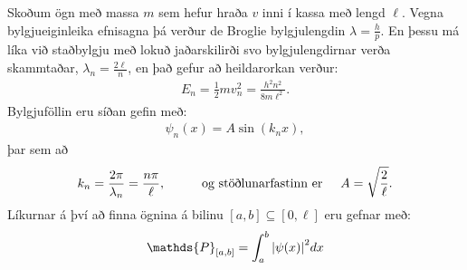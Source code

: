 \ifdefined \wholebook \else\documentclass[oneside]{book}\usepackage{EdlBook}\graphicspath{{figures/}}
\begin{document}
\begin{tcolorbox}
Skoðum ögn með massa $m$ sem hefur hraða $v$ inni í kassa með lengd $\ell$. Vegna bylgjueiginleika efnisagna þá verður de Broglie bylgjulengdin $\lambda = \frac{h}{p}$. En þessu má líka við staðbylgju með lokuð jaðarskilirði svo bylgjulengdirnar verða skammtaðar, $\lambda_n = \frac{2 \ell}{n}$, en það gefur að heildarorkan verður:
\begin{align*}
    E_n = \frac{1}{2}mv_n^2  = \frac{h^2 n^2}{8m\ell^2}.
\end{align*}
Bylgjuföllin eru síðan gefin með:
\vspace{-0.6cm}
\begin{align*}
    \psi_n(x) = A\sin(k_n x),
\end{align*}
þar sem að 
\vspace{-0.4cm}
\begin{align*}
     k_n = \frac{2\pi}{\lambda_n} = \frac{n\pi}{\ell}, \hspace{1cm} \text{og stöðlunarfastinn er} \hspace{0.5cm} A = \sqrt{\frac{2}{\ell}}.
\end{align*}
Líkurnar á því að finna ögnina á bilinu $[a,b] \subseteq [0,\ell]$ eru gefnar með:
\begin{align*}
    \mathds{P}_{[a,b]} = \int_{a}^{b} \abs{\psi(x)}^2 dx
\end{align*}
\end{tcolorbox}
\end{document}
